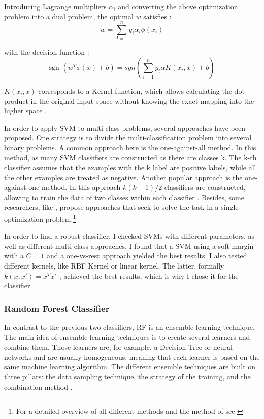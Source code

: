 \documentclass[12pt, a4paper, titlepage]{article}
\begin{document}
Introducing Lagrange multipliers $\alpha_i$ and converting the above optimization problem into a dual problem, the optimal $w$ satisfies \citep{Chang2001, Jordan2006}:
\[w = \sum_{I=1}^n y_i\alpha_i\phi(x_i)\]

with the decision function \citep{Chang2001}:
\[\text{sgn } (w^T\phi(x)+b) = sgn(\sum_{i=1}^n y_i \alpha K(x_i, x) +b)\]

$K(x_i, x)$ corresponds to a Kernel function, which allows calculating the dot product in the original input space without knowing the exact mapping into the higher space \citep{Han2012, Jordan2006}. 

In order to apply \ac{SVM} to multi-class problems, several approaches have been proposed. One strategy is to divide the multi-classification problem into several binary problems. A common approach here is the one-against-all method. In this method, as many \ac{SVM} classifiers are constructed as there are classes k. The k-th classifier assumes that the examples with the k label are positive labels, while all the other examples are treated as negative. Another popular approach is the one-against-one method. In this approach $k(k-1)/2$ classifiers are constructed, allowing to train the data of two classes within each classifier \citep{Hsu2002}. Besides, some researchers, like \citet{Crammer2001}, propose approaches that seek to solve the task in a single optimization problem.\footnote{For a detailed overview of all different methods and the method of \citet{Crammer2001} see \citet{Hsu2002,Crammer2001}}

In order to find a robust classifier, I checked \ac{SVM}s with different parameters, as well as different multi-class approaches. I found that a \ac{SVM} using a soft margin with a $C=1$ and a one-vs-rest approach yielded the best results. I also tested different kernels, like  RBF Kernel or linear kernel. The latter, formally  $k(x, x') = x^Tx'$ \citep{Jordan2006}, achieved the best results, which is why I chose it for the classifier. 

\subsubsection*{Random Forest Classifier}
In contrast to the previous two classifiers, \ac{RF} is an ensemble learning technique. The main idea of ensemble learning techniques is to create several learners and combine them. Those learners are, for example, a Decision Tree or neural networks and are usually homogeneous, meaning that each learner is based on the same machine learning algorithm. The different ensemble techniques are built on three pillars: the data sampling technique, the strategy of the training, and the combination method \citep{polikar2012, zhou2009}. 
\end{document}
